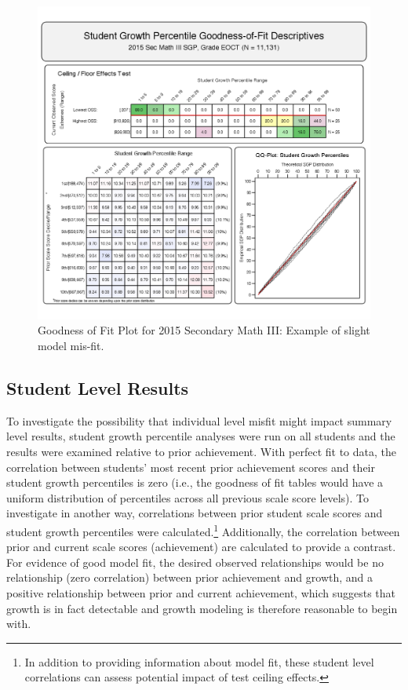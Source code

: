 \documentclass[12pt]{article}
\begin{document}
\begin{figure}[htbp]
\centering
\includegraphics{../img/Goodness_of_Fit/SEC_MATH_III.2015/2015_SEC_MATH_III_EOCT;2014_SEC_MATH_II_EOCT;2012_ALGEBRA_I_EOCT.png}
\caption{Goodness of Fit Plot for 2015 Secondary Math III: Example of
slight model mis-fit.}
\end{figure}

\pagebreak

\subsection{Student Level Results}\label{student-level-results}

To investigate the possibility that individual level misfit might impact
summary level results, student growth percentile analyses were run on
all students and the results were examined relative to prior
achievement. With perfect fit to data, the correlation between students'
most recent prior achievement scores and their student growth
percentiles is zero (i.e., the goodness of fit tables would have a
uniform distribution of percentiles across all previous scale score
levels). To investigate in another way, correlations between prior
student scale scores and student growth percentiles were
calculated.\footnote{In addition to providing information about model
  fit, these student level correlations can assess potential impact of
  test ceiling effects.} Additionally, the correlation between prior and
current scale scores (achievement) are calculated to provide a contrast.
For evidence of good model fit, the desired observed relationships would
be no relationship (zero correlation) between prior achievement and
growth, and a positive relationship between prior and current
achievement, which suggests that growth is in fact detectable and growth
modeling is therefore reasonable to begin with.
\end{document}
